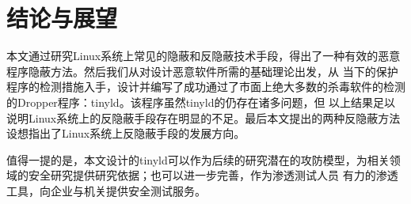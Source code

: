 \chapter{结论与展望}

本文通过研究Linux系统上常见的隐蔽和反隐蔽技术手段，得出了一种有效的恶意程序隐蔽方法。然后我们从对设计恶意软件所需的基础理论出发，从
当下的保护程序的检测措施入手，设计并编写了成功通过了市面上绝大多数的杀毒软件的检测的Dropper程序：tinyld。该程序虽然tinyld的仍存在诸多问题，但
以上结果足以说明Linux系统上的反隐蔽手段存在明显的不足。最后本文提出的两种反隐蔽方法设想指出了Linux系统上反隐蔽手段的发展方向。

值得一提的是，本文设计的tinyld可以作为后续的研究潜在的攻防模型，为相关领域的安全研究提供研究依据；也可以进一步完善，作为渗透测试人员
有力的渗透工具，向企业与机关提供安全测试服务。
